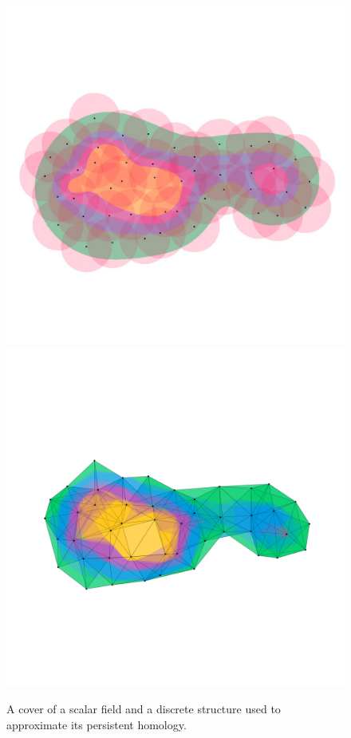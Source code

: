 \begin{figure}
  \centering
  \vspace{-4ex}
  \includegraphics[trim=100 600 100 700, clip, width=\linewidth]{figures/partial4/cover-comp.pdf}
  \includegraphics[trim=100 600 100 900, clip, width=\linewidth]{figures/partial4/complex_nosurf.pdf}
  \caption{A cover of a scalar field and a discrete structure used to approximate its persistent homology.}
\end{figure}

